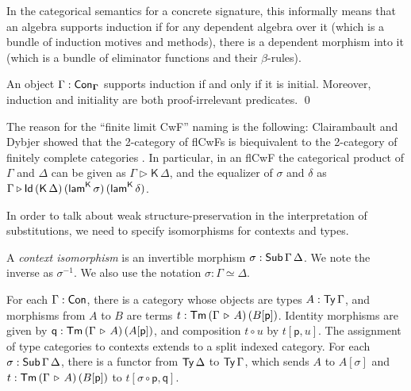 \documentclass[sigplan,review,anonymous]{acmart}\settopmatter{printfolios=true,printccs=false,printacmref=false}
\newcommand{\ext}{\triangleright}
\newcommand{\Kfam}{\mathsf{K}}
\newcommand{\p}{\mathsf{p}}
\newcommand{\q}{\mathsf{q}}
\newcommand{\lamK}{\mathsf{lam}^{\K}}
\newcommand{\bGamma}{\boldsymbol{\Gamma}}
\begin{document}
In the categorical semantics for a concrete signature, this informally means
that an algebra supports induction if for any dependent algebra over it (which
is a bundle of induction motives and methods), there is a dependent morphism
into it (which is a bundle of eliminator functions and their $\beta$-rules).

\begin{theorem}\label{thm:initialind}
An object $\Gamma : \Con_{\bGamma}$ supports induction if and only if it is
initial. Moreover, induction and initiality are both proof-irrelevant
predicates. \qed
\end{theorem}

The reason for the ``finite limit CwF'' naming is the following: Clairambault
and Dybjer showed that the 2-category of flCwFs is biequivalent to the
2-category of finitely complete categories
\cite{clairambault2014biequivalence}. In particular, in an flCwF the categorical
product of $\Gamma$ and $\Delta$ can be given as $\Gamma \ext \Kfam\, \Delta$,
and the equalizer of $\sigma$ and $\delta$ as $\Gamma\ext
\Id\,(\K\,\Delta)\,(\lamK\,\sigma)\,(\lamK\,\delta)$.

In order to talk about weak structure-preservation in the interpretation of substitutions, we need to specify isomorphisms for contexts and types.

\begin{definition} A \emph{context isomorphism} is an invertible morphism $\sigma : \mathsf{Sub}\,\Gamma\,\Delta$. We note the inverse as $\sigma^{-1}$. We also use the notation $\sigma : \Gamma \simeq \Delta$.
\end{definition}

\begin{definition}\label{def:type_categories} For each $\Gamma : \mathsf{Con}$, there is a category
whose objects are types $A : \mathsf{Ty}\,\Gamma$, and morphisms from $A$ to $B$ are
terms $t : \Tm\,(\Gamma\,\ext\,A)\,(B[\p])$. Identity morphisms are given by $\q :
\Tm\,(\Gamma\,\ext\,A)\,(A[\p])$, and composition $t \circ u$ by $t[\p, u]$. The
assignment of type categories to contexts extends to a split indexed category. For
each $\sigma : \mathsf{Sub}\,\Gamma\,\Delta$, there is a functor from $\mathsf{Ty}\,\Delta$ to
$\mathsf{Ty}\,\Gamma$, which sends $A$ to $A[\sigma]$ and $t :
\Tm\,(\Gamma\,\ext\,A)\,(B[\p])$ to $t[\sigma\circ \p, \q]$.
\end{definition}
\end{document}
